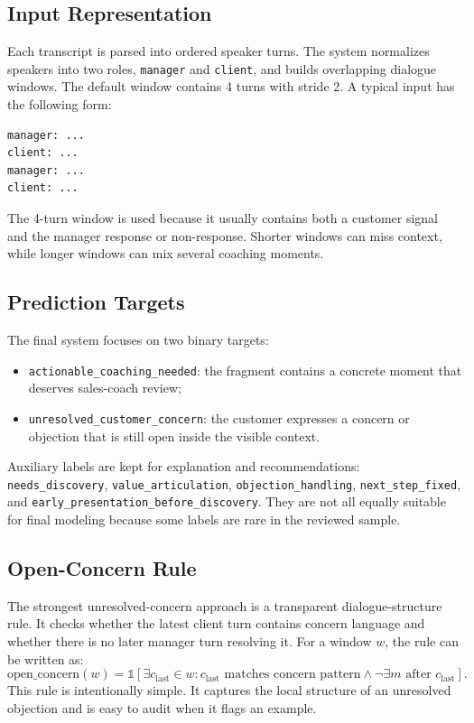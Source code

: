 \documentclass{article}
\begin{document}
\subsection{Input Representation}
Each transcript is parsed into ordered speaker turns. The system normalizes speakers into two roles, \texttt{manager} and \texttt{client}, and builds overlapping dialogue windows. The default window contains 4 turns with stride 2. A typical input has the following form:
\begin{verbatim}
manager: ...
client: ...
manager: ...
client: ...
\end{verbatim}

The 4-turn window is used because it usually contains both a customer signal and the manager response or non-response. Shorter windows can miss context, while longer windows can mix several coaching moments.

\subsection{Prediction Targets}
The final system focuses on two binary targets:
\begin{itemize}
    \item \texttt{actionable\_coaching\_needed}: the fragment contains a concrete moment that deserves sales-coach review;
    \item \texttt{unresolved\_customer\_concern}: the customer expresses a concern or objection that is still open inside the visible context.
\end{itemize}

Auxiliary labels are kept for explanation and recommendations: \texttt{needs\_discovery}, \texttt{value\_articulation}, \texttt{objection\_handling}, \texttt{next\_step\_fixed}, and \texttt{early\_presentation\_before\_discovery}. They are not all equally suitable for final modeling because some labels are rare in the reviewed sample.

\subsection{Open-Concern Rule}
The strongest unresolved-concern approach is a transparent dialogue-structure rule. It checks whether the latest client turn contains concern language and whether there is no later manager turn resolving it. For a window $w$, the rule can be written as:
\[
\text{open\_concern}(w)=
\mathbb{1}[\exists c_{\text{last}} \in w:
c_{\text{last}} \text{ matches concern pattern}
\land \neg \exists m \text{ after } c_{\text{last}}].
\]
This rule is intentionally simple. It captures the local structure of an unresolved objection and is easy to audit when it flags an example.
\end{document}
